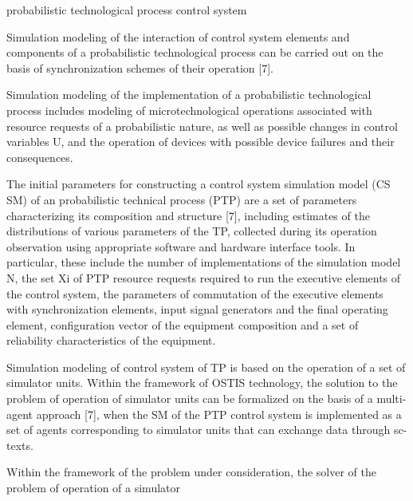 \documentclass{article}
\begin{document}
\begin{multicols}{2}
\begin{center}
probabilistic technological process control system
\end{center}\par
Simulation modeling of the interaction of control
system elements and components of a probabilistic technological process can be carried out on the basis of
synchronization schemes of their operation [7].\par 
Simulation modeling of the implementation of a
probabilistic technological process includes modeling of
microtechnological operations associated with resource
requests of a probabilistic nature, as well as possible
changes in control variables U, and the operation of
devices with possible device failures and their consequences.\par 
The initial parameters for constructing a control system simulation model (CS SM) of an probabilistic technical process (PTP) are a set of parameters characterizing
its composition and structure [7], including estimates of
the distributions of various parameters of the TP, collected during its operation observation using appropriate
software and hardware interface tools. In particular, these
include the number of implementations of the simulation
model N, the set Xi of PTP resource requests required
to run the executive elements of the control system, the
parameters of commutation of the executive elements
with synchronization elements, input signal generators
and the final operating element, configuration vector
of the equipment composition and a set of reliability
characteristics of the equipment.\par 
Simulation modeling of control system of TP is based
on the operation of a set of simulator units. Within
the framework of OSTIS technology, the solution to
the problem of operation of simulator units can be
formalized on the basis of a multi-agent approach [7],
when the SM of the PTP control system is implemented
as a set of agents corresponding to simulator units that
can exchange data through sc-texts.\par
Within the framework of the problem under consideration, the solver of the problem of operation of a simulator 
\end{multicols}
\end{document}
